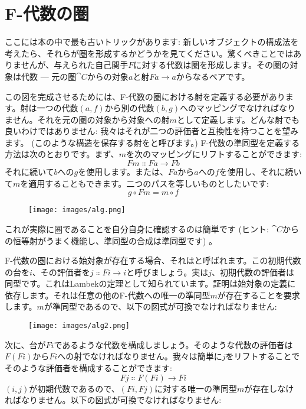 \section{F-代数の圏}

ここには本の中で最も古いトリックがあります: 新しいオブジェクトの構成法を考えたら、それらが圏を形成するかどうかを見てください。驚くべきことではありませんが、与えられた自己関手$F$に対する代数は圏を形成します。その圏の対象は代数 --- 元の圏$\cat{C}$からの対象$a$と射$F a \to a$からなるペアです。

この図を完成させるためには、F-代数の圏における射を定義する必要があります。射は一つの代数$(a, f)$から別の代数$(b, g)$へのマッピングでなければなりません。それを元の圏の対象から対象への射$m$として定義します。どんな射でも良いわけではありません: 我々はそれが二つの評価者と互換性を持つことを望みます。 (このような構造を保存する射をと呼びます。) F-代数の準同型を定義する方法は次のとおりです。まず、$m$を次のマッピングにリフトすることができます: 
\[F m \Colon F a \to F b\]
それに続いて$b$への$g$を使用します。または、$F a$から$a$への$f$を使用し、それに続いて$m$を適用することもできます。二つのパスを等しいものとしたいです: 
\[g \circ F m = m \circ f\]

\begin{figure}[H]
  \centering
  \texttt{[image: images/alg.png]}
\end{figure}

\noindent
これが実際に圏であることを自分自身に確認するのは簡単です (ヒント: $\cat{C}$からの恒等射がうまく機能し、準同型の合成は準同型です) 。

F-代数の圏における始対象が存在する場合、それはと呼ばれます。この初期代数の台を$i$、その評価者を$j \Colon F i \to i$と呼びましょう。実は$j$、初期代数の評価者は同型です。これはLambekの定理として知られています。証明は始対象の定義に依存します。それは任意の他のF-代数への唯一の準同型$m$が存在することを要求します。$m$が準同型であるので、以下の図式が可換でなければなりません: 

\begin{figure}[H]
  \centering
  \texttt{[image: images/alg2.png]}
\end{figure}

\noindent
次に、台が$F i$であるような代数を構成しましょう。そのような代数の評価者は$F (F i)$から$F i$への射でなければなりません。我々は簡単に$j$をリフトすることでそのような評価者を構成することができます: 
\[F j \Colon F (F i) \to F i\]
$(i, j)$が初期代数であるので、$(F i, F j)$に対する唯一の準同型$m$が存在しなければなりません。以下の図式が可換でなければなりません: 

